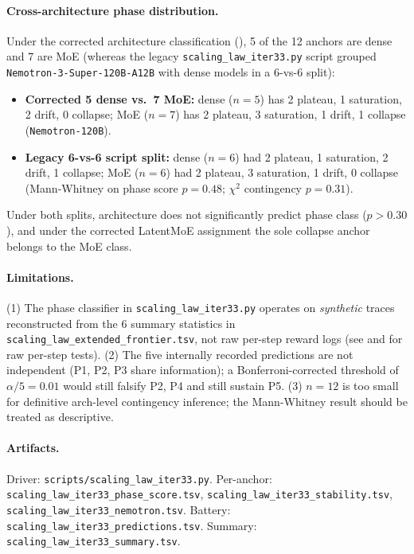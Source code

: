 \paragraph{Cross-architecture phase distribution.}
Under the corrected architecture classification (),
5 of the 12 anchors are dense and 7 are MoE (whereas the legacy
\texttt{scaling\_law\_iter33.py} script grouped \texttt{Nemotron-3-Super-120B-A12B}
with dense models in a 6-vs-6 split):
\begin{itemize}
\item \textbf{Corrected 5 dense vs.\ 7 MoE:} dense ($n=5$) has 2 plateau,
  1 saturation, 2 drift, 0 collapse; MoE ($n=7$) has 2 plateau,
  3 saturation, 1 drift, 1 collapse (\texttt{Nemotron-120B}).
\item \textbf{Legacy 6-vs-6 script split:} dense ($n=6$) had 2 plateau,
  1 saturation, 2 drift, 1 collapse; MoE ($n=6$) had 2 plateau,
  3 saturation, 1 drift, 0 collapse (Mann-Whitney on phase score
  $p{=}0.48$; $\chi^2$ contingency $p{=}0.31$).
\end{itemize}
Under both splits, architecture does not significantly predict phase
class ($p > 0.30$), and under the corrected LatentMoE assignment the
sole collapse anchor belongs to the MoE class.

\paragraph{Limitations.}
(1) The phase classifier in \texttt{scaling\_law\_iter33.py} operates
on \emph{synthetic} traces reconstructed from the 6 summary statistics
in \texttt{scaling\_law\_extended\_frontier.tsv}, not raw per-step
reward logs (see  and 
for raw per-step tests).
(2) The five internally recorded predictions are not independent
(P1, P2, P3 share information); a Bonferroni-corrected threshold of
$\alpha/5 = 0.01$ would still falsify P2, P4 and still sustain P5.
(3) $n=12$ is too small for definitive arch-level contingency inference; the
Mann-Whitney result should be treated as descriptive.

\paragraph{Artifacts.}
Driver: \texttt{scripts/scaling\_law\_iter33.py}.
Per-anchor: \texttt{scaling\_law\_iter33\_phase\_score.tsv},
\texttt{scaling\_law\_iter33\_stability.tsv},
\texttt{scaling\_law\_iter33\_nemotron.tsv}.
Battery: \texttt{scaling\_law\_iter33\_predictions.tsv}.
Summary: \texttt{scaling\_law\_iter33\_summary.tsv}.
